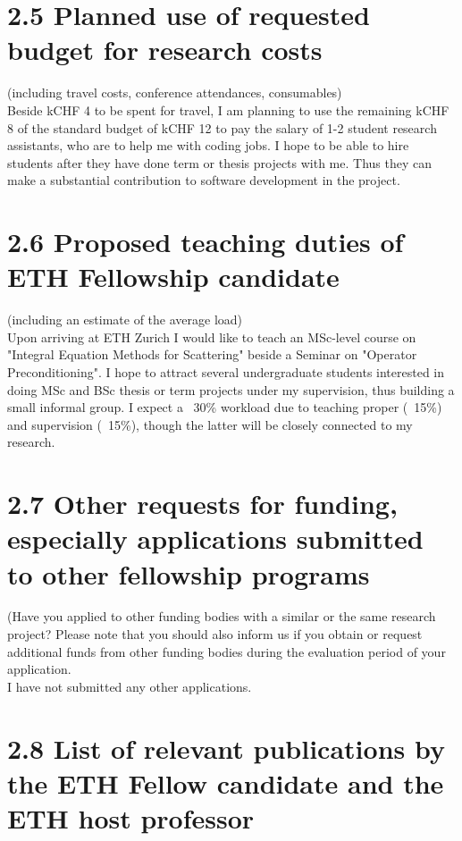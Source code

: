 \documentclass[]{article}
\begin{document}
\section*{2.5 Planned use of requested budget for research costs }
(including travel costs, conference attendances, consumables)\\

Beside kCHF 4 to be spent for travel, I am planning to use the remaining kCHF 8 of the standard budget of kCHF 12 to pay the salary of 1-2 student research assistants, who are to help me with coding jobs. I hope to be able to hire students after they have done term or thesis projects with me. Thus they can make a substantial contribution to software development in the project.

\section*{2.6 Proposed teaching duties of ETH Fellowship candidate}
(including an estimate of the average load)\\

Upon arriving at ETH Zurich I would like to teach an MSc-level course on "Integral
Equation Methods for Scattering" beside a Seminar on "Operator Preconditioning". I hope to attract several undergraduate students interested in doing MSc and BSc thesis or term projects under my supervision, thus building a small informal group. I expect a ~30\% workload due to teaching proper (~15\%) and supervision (~15\%), though the latter will be closely connected to my research.

\section*{2.7 Other requests for funding, especially applications submitted to other fellowship programs}
	(Have you applied to other funding bodies with a similar or the same research project? Please note that you should also inform us if you obtain or request additional funds from other funding bodies during the evaluation period of your application.\\
	
I have not submitted any other applications.

\section*{2.8 List of relevant publications by the ETH Fellow candidate and the ETH host professor}
\end{document}
